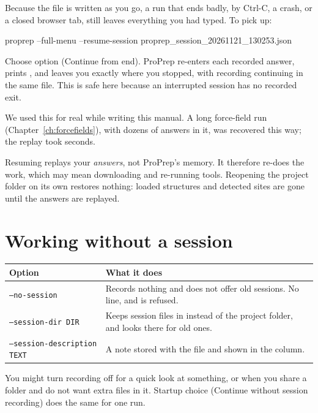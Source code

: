 Because the file is written as you go, a run that ends badly, by Ctrl-C, a
crash, or a closed browser tab, still leaves everything you had typed. To pick
up:

\begin{terminal}
proprep --full-menu --resume-session proprep_session_20261121_130253.json
\end{terminal}

Choose option  (\textsf{Continue from end}). ProPrep re-enters each
recorded answer, prints , and leaves you exactly where you stopped, with recording
continuing in the same file. This is safe here because an interrupted session
has no recorded exit.

We used this for real while writing this manual. A long force-field run
(Chapter~\ref{ch:forcefields}), with dozens of answers in it, was recovered
this way; the replay took seconds.

\begin{watchout}
Resuming replays your \emph{answers}, not ProPrep's memory. It therefore
re-does the work, which may mean downloading and re-running tools. Reopening
the project folder on its own restores nothing: loaded structures and detected
sites are gone until the answers are replayed.
\end{watchout}

\section{Working without a session}

\begin{tabularx}{\linewidth}{@{}lL@{}}
\toprule
\textbf{Option} & \textbf{What it does} \\
\midrule
\texttt{--no-session} & Records nothing and does not offer old sessions. No
   line, and  is refused. \\
\texttt{--session-dir DIR} & Keeps session files in  instead of the
  project folder, and looks there for old ones. \\
\texttt{--session-description TEXT} & A note stored with the file and shown
  in the  column. \\
\bottomrule
\end{tabularx}

\medskip
You might turn recording off for a quick look at something, or when you share
a folder and do not want extra files in it. Startup choice 
(\textsf{Continue without session recording}) does the same for one run.

